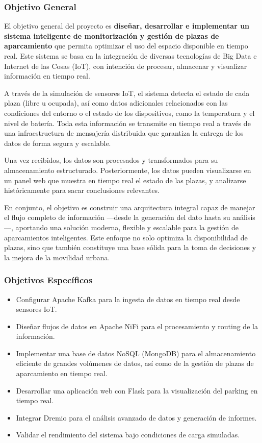\documentclass{../../../miPlantilla}
\begin{document}
\subsubsection{Objetivo General}
El objetivo general del proyecto es \textbf{diseñar, desarrollar e implementar un sistema inteligente de monitorización y
gestión de plazas de aparcamiento} que permita optimizar el uso del espacio disponible en tiempo real. Este sistema se
basa en la integración de diversas tecnologías de Big Data e Internet de las Cosas (IoT), con intención de procesar, 
almacenar y visualizar información en tiempo real.

A través de la simulación de sensores IoT, el sistema detecta el estado de cada plaza (libre u ocupada), así como datos
adicionales relacionados con las condiciones del entorno o el estado de los dispositivos, como la temperatura y el nivel
de batería. Toda esta información se transmite en tiempo real a través de una infraestructura de mensajería distribuida
que garantiza la entrega de los datos de forma segura y escalable.

\newpage

Una vez recibidos, los datos son procesados y transformados para su almacenamiento estructurado. Posteriormente, los
datos pueden visualizarse en un panel web que muestra en tiempo real el estado de las plazas, y analizarse históricamente
para sacar conclusiones relevantes.

En conjunto, el objetivo es construir una arquitectura integral capaz de manejar el flujo completo de información —desde
la generación del dato hasta su análisis—, aportando una solución moderna, flexible y escalable para la gestión de
aparcamientos inteligentes. Este enfoque no solo optimiza la disponibilidad de plazas, sino que también constituye una
base sólida para la toma de decisiones y la mejora de la movilidad urbana.

\subsubsection{Objetivos Específicos}
\begin{itemize}
  \item Configurar Apache Kafka para la ingesta de datos en tiempo real desde sensores IoT.
  \item Diseñar flujos de datos en Apache NiFi para el procesamiento y routing de la información.
  \item Implementar una base de datos NoSQL (MongoDB) para el almacenamiento eficiente de grandes volúmenes de datos, 
        así como de la gestión de plazas de aparcamiento en tiempo real.
  \item Desarrollar una aplicación web con Flask para la visualización del parking en tiempo real.
  \item Integrar Dremio para el análisis avanzado de datos y generación de informes.
  \item Validar el rendimiento del sistema bajo condiciones de carga simuladas.
\end{itemize}
\end{document}
